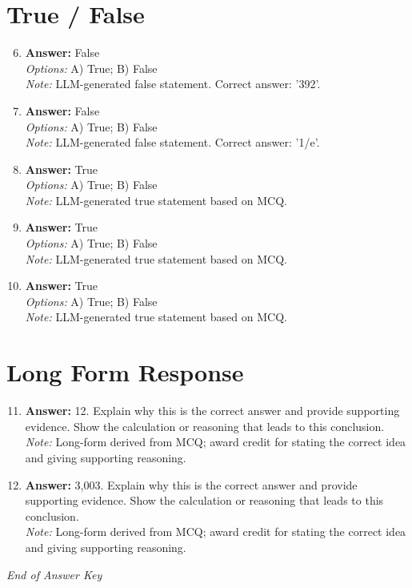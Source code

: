 \documentclass[12pt]{article}
\begin{document}
\section*{True / False}
\begin{enumerate}[label=\arabic*.]
\setcounter{enumi}{5}
\item \textbf{Answer:} False
\\ \textit{Options:} A) True; B) False
\\ \textit{Note:} LLM-generated false statement. Correct answer: '392'.
\item \textbf{Answer:} False
\\ \textit{Options:} A) True; B) False
\\ \textit{Note:} LLM-generated false statement. Correct answer: '1/e'.
\item \textbf{Answer:} True
\\ \textit{Options:} A) True; B) False
\\ \textit{Note:} LLM-generated true statement based on MCQ.
\item \textbf{Answer:} True
\\ \textit{Options:} A) True; B) False
\\ \textit{Note:} LLM-generated true statement based on MCQ.
\item \textbf{Answer:} True
\\ \textit{Options:} A) True; B) False
\\ \textit{Note:} LLM-generated true statement based on MCQ.
\end{enumerate}

\section*{Long Form Response}
\begin{enumerate}[label=\arabic*.]
\setcounter{enumi}{10}
\item \textbf{Answer:} 12. Explain why this is the correct answer and provide supporting evidence. Show the calculation or reasoning that leads to this conclusion.
\\ \textit{Note:} Long-form derived from MCQ; award credit for stating the correct idea and giving supporting reasoning.
\item \textbf{Answer:} 3,003. Explain why this is the correct answer and provide supporting evidence. Show the calculation or reasoning that leads to this conclusion.
\\ \textit{Note:} Long-form derived from MCQ; award credit for stating the correct idea and giving supporting reasoning.
\end{enumerate}

\vfill
\noindent\textit{End of Answer Key}
\end{document}
